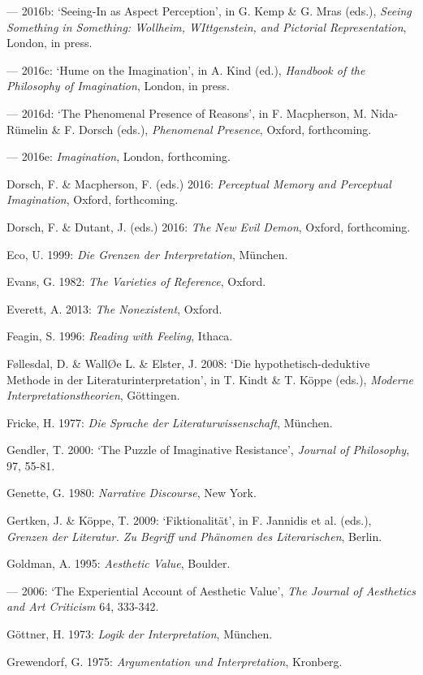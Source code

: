 \begin{hangparas}{.5cm}{1}
--- 2016b: `Seeing-In as Aspect Perception', in G. Kemp \& G. Mras (eds.), \emph{Seeing Something in Something: Wollheim, WIttgenstein, and Pictorial Representation}, London, in press.

--- 2016c: `Hume on the Imagination', in A. Kind (ed.), \emph{Handbook of the Philosophy of Imagination}, London, in press.
 
--- 2016d: `The Phenomenal Presence of Reasons', in F. Macpherson, M. Nida-R\"umelin \& F. Dorsch (eds.), \emph{Phenomenal Presence}, Oxford, forthcoming. 
 
--- 2016e: \emph{Imagination}, London, forthcoming.

Dorsch, F. \& Macpherson, F. (eds.) 2016: \emph{Perceptual Memory and Perceptual Imagination}, Oxford, forthcoming. 

Dorsch, F. \& Dutant, J. (eds.) 2016: \emph{The New Evil Demon}, Oxford, forthcoming.

Eco, U. 1999: \emph{Die Grenzen der Interpretation}, M\"unchen. 

Evans, G. 1982: \emph{The Varieties of Reference}, Oxford. 

Everett, A. 2013: \emph{The Nonexistent}, Oxford. 

Feagin, S. 1996: \emph{Reading with Feeling}, Ithaca.

F\o{}llesdal, D. \& Wall\O{}e L. \& Elster, J. 2008: `Die hypothetisch-deduktive Methode in der Literaturinterpretation', in T. Kindt \& T. K\"oppe (eds.), \emph{Moderne Interpretationstheorien}, G\"ottingen.

Fricke, H. 1977: \emph{Die Sprache der Literaturwissenschaft}, M\"unchen.

Gendler, T. 2000: `The Puzzle of Imaginative Resistance', \emph{Journal of Philosophy}, 97, 55-81.

Genette, G. 1980: \emph{Narrative Discourse}, New York. 

Gertken, J. \& K\"oppe, T. 2009: `Fiktionalit\"at', in F. Jannidis et al. (eds.), \emph{Grenzen der Literatur. Zu Begriff und Ph\"anomen des Literarischen}, Berlin. 

Goldman, A. 1995: \emph{Aesthetic Value}, Boulder. 

--- 2006: `The Experiential Account of Aesthetic Value', \emph{The Journal of Aesthetics and Art Criticism} 64, 333-342.

G\"ottner, H. 1973: \emph{Logik der Interpretation}, M\"unchen.

Grewendorf, G. 1975: \emph{Argumentation und Interpretation}, Kronberg.


\end{hangparas}
